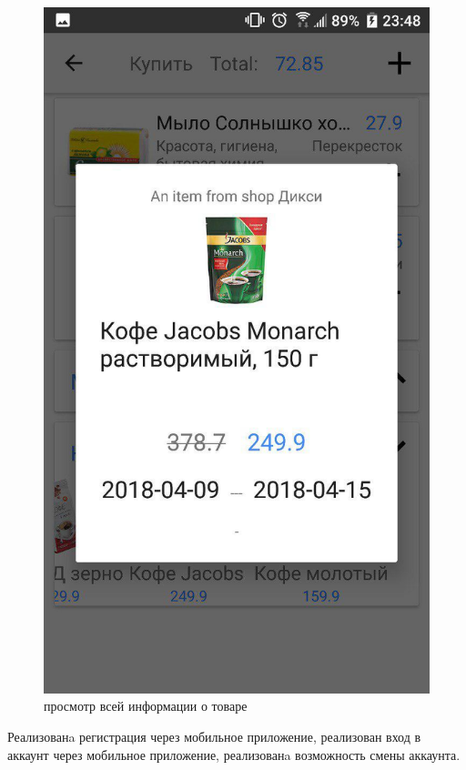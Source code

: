 \begin{figure}[h!]
    \includegraphics[height=0.38\textheight]{./screenshots/3/full_item_preview.jpg}
    \caption{\small{просмотр всей информации о товаре}}
    \endminipage{}
\end{figure}


Реализованa регистрация через мобильное приложение, реализован вход
в аккаунт через мобильное приложение, реализованa возможность смены аккаунта.

